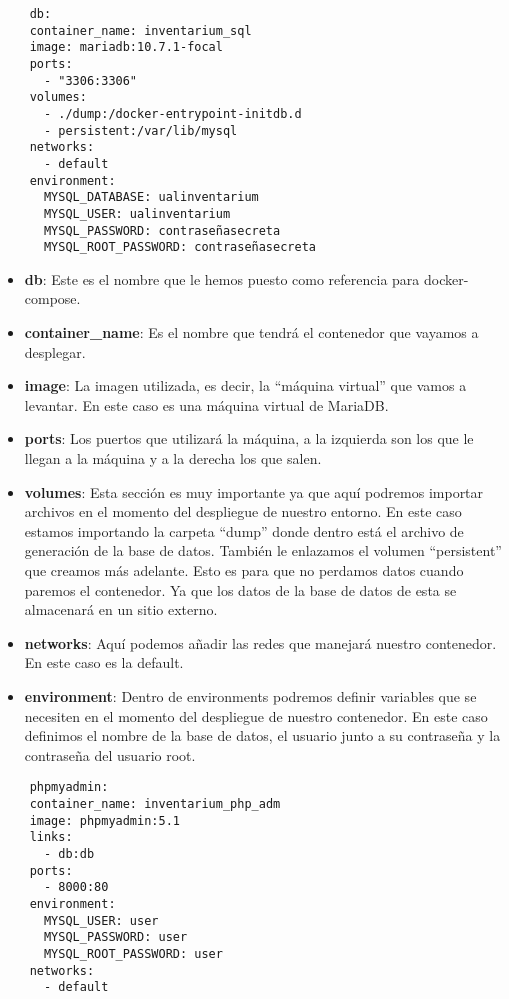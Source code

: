 \begin{verbatim}
    db:
    container_name: inventarium_sql
    image: mariadb:10.7.1-focal
    ports:
      - "3306:3306"
    volumes:
      - ./dump:/docker-entrypoint-initdb.d
      - persistent:/var/lib/mysql
    networks:
      - default
    environment:
      MYSQL_DATABASE: ualinventarium
      MYSQL_USER: ualinventarium
      MYSQL_PASSWORD: contraseñasecreta
      MYSQL_ROOT_PASSWORD: contraseñasecreta
\end{verbatim}
\begin{itemize}
    \item \textbf{db}: Este es el nombre que le hemos puesto como referencia para docker-compose.
    \item \textbf{container\_name}: Es el nombre que tendrá el contenedor que vayamos a desplegar.
    \item \textbf{image}: La imagen utilizada, es decir, la ``máquina virtual'' que vamos a levantar. En este caso es una máquina virtual de MariaDB.
    \item \textbf{ports}: Los puertos que utilizará la máquina, a la izquierda son los que le llegan a la máquina y a la derecha los que salen.
    \item \textbf{volumes}: Esta sección es muy importante ya que aquí podremos importar archivos en el momento del despliegue de nuestro entorno. En este caso estamos importando la carpeta ``dump'' donde dentro está el archivo de generación de la base de datos. También le enlazamos el volumen ``persistent'' que creamos más adelante. Esto es para que no perdamos datos cuando paremos el contenedor. Ya que los datos de la base de datos de esta se almacenará en un sitio externo.
    \item \textbf{networks}: Aquí podemos añadir las redes que manejará nuestro contenedor. En este caso es la default.
    \item \textbf{environment}: Dentro de environments podremos definir variables que se necesiten en el momento del despliegue de nuestro contenedor. En este caso definimos el nombre de la base de datos, el usuario junto a su contraseña y la contraseña del usuario root.
\end{itemize}
\begin{verbatim}
    phpmyadmin:
    container_name: inventarium_php_adm
    image: phpmyadmin:5.1
    links:
      - db:db
    ports:
      - 8000:80
    environment:
      MYSQL_USER: user
      MYSQL_PASSWORD: user
      MYSQL_ROOT_PASSWORD: user
    networks:
      - default
\end{verbatim}
